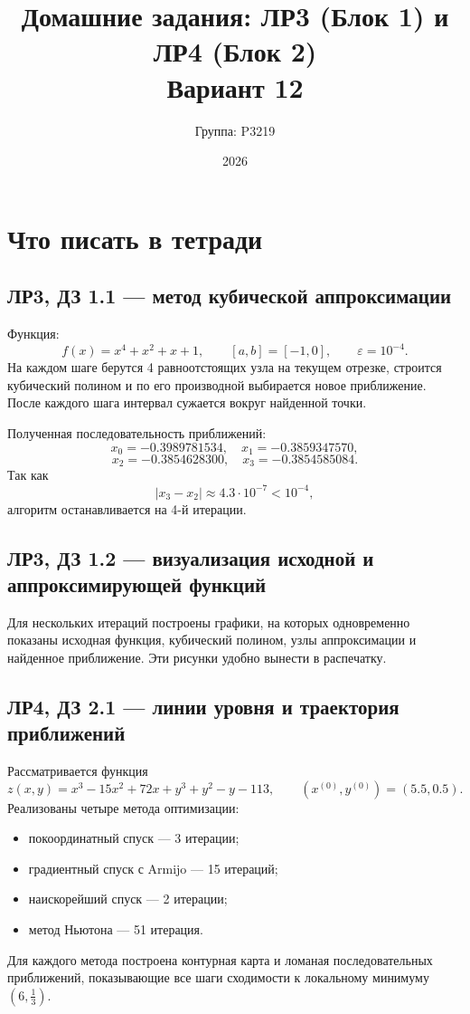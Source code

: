 \documentclass[12pt,a4paper]{article}
\title{Домашние задания: ЛР3 (Блок 1) и ЛР4 (Блок 2) \\[0.5em] Вариант 12}
\author{Группа: P3219}
\date{2026}
\begin{document}
\maketitle
\tableofcontents
\newpage

\section{Что писать в тетради}

\subsection{ЛР3, ДЗ 1.1 --- метод кубической аппроксимации}
Функция:
\[
f(x)=x^4+x^2+x+1, \qquad [a,b]=[-1,0], \qquad \varepsilon=10^{-4}.
\]
На каждом шаге берутся 4 равноотстоящих узла на текущем отрезке, строится кубический полином и по его производной выбирается новое приближение. После каждого шага интервал сужается вокруг найденной точки.

Полученная последовательность приближений:
\[
x_0=-0.3989781534, \quad x_1=-0.3859347570,
\]
\[
x_2=-0.3854628300, \quad x_3=-0.3854585084.
\]
Так как
\[
|x_3-x_2| \approx 4.3\cdot 10^{-7} < 10^{-4},
\]
алгоритм останавливается на 4-й итерации.

\subsection{ЛР3, ДЗ 1.2 --- визуализация исходной и аппроксимирующей функций}
Для нескольких итераций построены графики, на которых одновременно показаны исходная функция, кубический полином, узлы аппроксимации и найденное приближение. Эти рисунки удобно вынести в распечатку.

\subsection{ЛР4, ДЗ 2.1 --- линии уровня и траектория приближений}
Рассматривается функция
\[
z(x,y)=x^3 - 15x^2 + 72x + y^3 + y^2 - y - 113,
\qquad (x^{(0)},y^{(0)})=(5.5, 0.5).
\]
Реализованы четыре метода оптимизации:
\begin{itemize}
  \item покоординатный спуск --- 3 итерации;
  \item градиентный спуск с Armijo --- 15 итераций;
  \item наискорейший спуск --- 2 итерации;
  \item метод Ньютона --- 51 итерация.
\end{itemize}
Для каждого метода построена контурная карта и ломаная последовательных приближений, показывающие все шаги сходимости к локальному минимуму $(6, \frac{1}{3})$.
\end{document}
